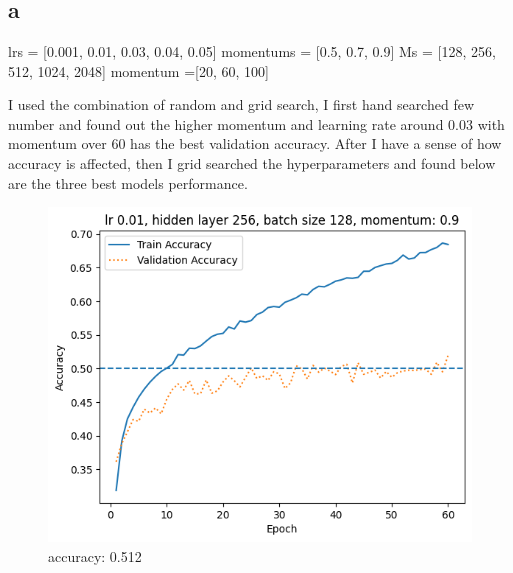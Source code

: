 \newpage
\section{}

\subsection{a}

lrs = [0.001, 0.01, 0.03, 0.04, 0.05]
momentums = [0.5, 0.7, 0.9]
Ms = [128, 256, 512, 1024, 2048]
momentum =[20, 60, 100]

I used the combination of random and grid search, I first hand searched
few number and found out the higher momentum and learning rate around 
0.03 with momentum over 60 has the best validation accuracy. After I have a sense of 
how accuracy is affected, then I grid searched the hyperparameters and found
below are the three best models performance.

\begin{figure}[!ht]
    \centering\includegraphics[width=1\linewidth]{A5-0.png}
    \caption{accuracy: 0.512}
\end{figure}


